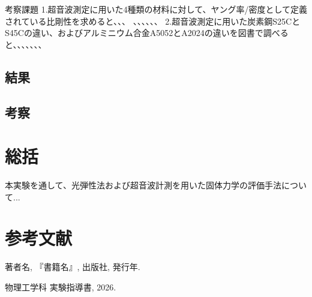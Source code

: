 \documentclass[uplatex,dvipdfmx,titlepage]{jsarticle}
\begin{document}
考察課題
1.超音波測定に用いた4種類の材料に対して、ヤング率/密度として定義されている比剛性を求めると、、、
、、、、、、
2.超音波測定に用いた炭素鋼S25CとS45Cの違い、およびアルミニウム合金A5052とA2024の違いを図書で調べると、、、、、、、





\subsection{結果}

\subsection{考察}


\section{総括}
本実験を通して、光弾性法および超音波計測を用いた固体力学の評価手法について...

\section*{参考文献}
\begin{enumerate}[label={[\arabic*]}]
    \item 著者名, 『書籍名』, 出版社, 発行年.
    \item 物理工学科 実験指導書, 2026.
\end{enumerate}
\end{document}
